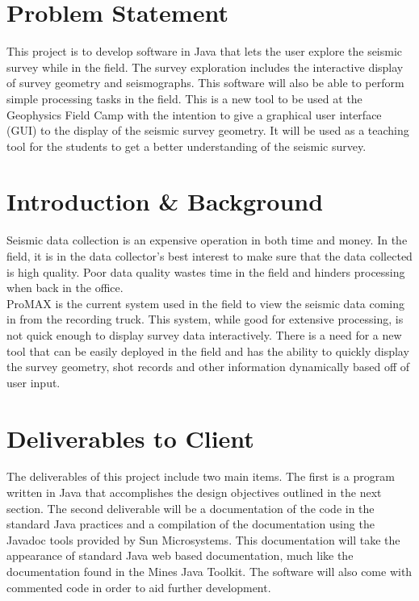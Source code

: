\documentclass[12pt]{article}
\begin{document}
\newpage
\tableofcontents
\listoffigures
\listoftables
\newpage

\section{Problem Statement}

This project is to develop software in Java that lets the user explore the seismic survey while in the field. The survey exploration includes the interactive display of survey geometry and seismographs. This software will also be able to perform simple processing tasks in the field. This is a new tool to be used at the Geophysics Field Camp with the intention to give a graphical user interface (GUI) to the display of the seismic survey geometry. It will be used as a teaching tool for the students to get a better understanding of the seismic survey.

\section{Introduction \& Background}

Seismic data collection is an expensive operation in both time and money. In the field, it is in the data collector's best interest to make sure that the data collected is high quality. Poor data quality wastes time in the field and hinders processing when back in the office. \\

ProMAX is the current system used in the field to view the seismic data coming in from the recording truck. This system, while good for extensive processing, is not quick enough to display survey data interactively. There is a need for a new tool that can be easily deployed in the field and has the ability to quickly display the survey geometry, shot records and other information dynamically based off of user input.

\section{Deliverables to Client}

The deliverables of this project include two main items. The first is a program written in Java that accomplishes the design objectives outlined in the next section. The second deliverable will be a documentation of the code in the standard Java practices and a compilation of the documentation using the Javadoc tools provided by Sun Microsystems. This documentation will take the appearance of standard Java web based documentation, much like the documentation found in the Mines Java Toolkit. The software will also come with commented code in order to aid further development. 
\end{document}

